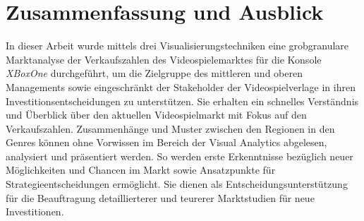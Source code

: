 \documentclass[usegeometry=true]{scrartcl}
\begin{document}
\section{Zusammenfassung und Ausblick}
In dieser Arbeit wurde mittels drei Visualisierungstechniken eine grobgranulare Marktanalyse 
der Verkaufszahlen des Videospielemarktes für die Konsole \textit{XBoxOne} durchgeführt, 
um die Zielgruppe des mittleren und oberen Managements sowie eingeschränkt der Stakeholder der Videospielverlage 
in ihren Investitionsentscheidungen zu unterstützen.
Sie erhalten ein schnelles Verständnis und Überblick über den aktuellen Videospielmarkt mit Fokus auf den Verkaufszahlen.
Zusammenhänge und Muster zwischen den Regionen in den Genres können ohne Vorwissen im Bereich der Visual Analytics abgelesen, analysiert und präsentiert werden.
So werden erste Erkenntnisse bezüglich neuer Möglichkeiten und Chancen im Markt sowie Ansatzpunkte für Strategieentscheidungen ermöglicht. 
Sie dienen als Entscheidungsunterstützung für die Beauftragung detaillierterer und teurerer Marktstudien für neue Investitionen.
\end{document}
